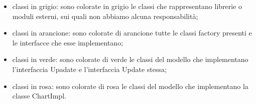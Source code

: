 \begin{itemize}
\item classi in grigio: sono colorate in grigio le classi che rappresentano librerie o moduli esterni, sui quali non abbiamo alcuna responsabilità;
\item classi in arancione: sono colorate di arancione tutte le classi factory presenti e le interfacce che esse implementano;
\item classi in verde: sono colorate di verde le classi del modello che implementano l'interfaccia Upadate e l'interfaccia Update stessa;
\item classi in rosa: sono colorate di rosa le classi del modello che implementano la classe ChartImpl. 
\end{itemize}






